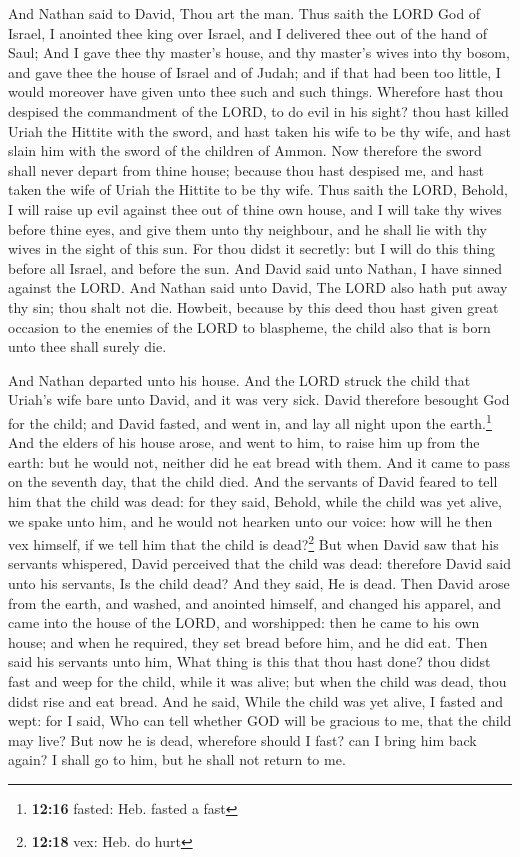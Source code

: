  And Nathan said to David, Thou art the man. Thus saith
the LORD God of Israel, I anointed thee king over Israel, and I
delivered thee out of the hand of Saul;  And I gave thee
thy master's house, and thy master's wives into thy bosom, and gave thee
the house of Israel and of Judah; and if that had been too little, I
would moreover have given unto thee such and such things. 
Wherefore hast thou despised the commandment of the LORD, to do evil in
his sight? thou hast killed Uriah the Hittite with the sword, and hast
taken his wife to be thy wife, and hast slain him with the sword of the
children of Ammon.  Now therefore the sword shall never
depart from thine house; because thou hast despised me, and hast taken
the wife of Uriah the Hittite to be thy wife.  Thus saith
the LORD, Behold, I will raise up evil against thee out of thine own
house, and I will take thy wives before thine eyes, and give them unto
thy neighbour, and he shall lie with thy wives in the sight of this sun.
 For thou didst it secretly: but I will do this thing
before all Israel, and before the sun.  And David said
unto Nathan, I have sinned against the LORD. And Nathan said unto David,
The LORD also hath put away thy sin; thou shalt not die. 
Howbeit, because by this deed thou hast given great occasion to the
enemies of the LORD to blaspheme, the child also that is born unto thee
shall surely die.

 And Nathan departed unto his house. And the LORD struck
the child that Uriah's wife bare unto David, and it was very sick.
 David therefore besought God for the child; and David
fasted, and went in, and lay all night upon the earth.\footnote{\textbf{12:16}
  fasted: Heb. fasted a fast}  And the elders of his
house arose, and went to him, to raise him up from the earth: but he
would not, neither did he eat bread with them.  And it
came to pass on the seventh day, that the child died. And the servants
of David feared to tell him that the child was dead: for they said,
Behold, while the child was yet alive, we spake unto him, and he would
not hearken unto our voice: how will he then vex himself, if we tell him
that the child is dead?\footnote{\textbf{12:18} vex: Heb. do hurt}
 But when David saw that his servants whispered, David
perceived that the child was dead: therefore David said unto his
servants, Is the child dead? And they said, He is dead. 
Then David arose from the earth, and washed, and anointed himself, and
changed his apparel, and came into the house of the LORD, and
worshipped: then he came to his own house; and when he required, they
set bread before him, and he did eat.  Then said his
servants unto him, What thing is this that thou hast done? thou didst
fast and weep for the child, while it was alive; but when the child was
dead, thou didst rise and eat bread.  And he said, While
the child was yet alive, I fasted and wept: for I said, Who can tell
whether GOD will be gracious to me, that the child may live?
 But now he is dead, wherefore should I fast? can I bring
him back again? I shall go to him, but he shall not return to me.

